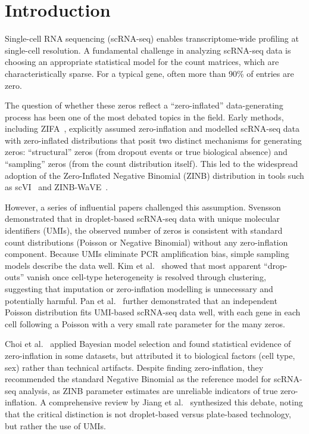 \documentclass{article}
\begin{document}
\section{Introduction}

Single-cell RNA sequencing (scRNA-seq) enables transcriptome-wide profiling at single-cell resolution.
A fundamental challenge in analyzing scRNA-seq data is choosing an appropriate statistical model for the count matrices, which are characteristically sparse.
For a typical gene, often more than 90\% of entries are zero.

The question of whether these zeros reflect a ``zero-inflated'' data-generating process has been one of the most debated topics in the field.
Early methods, including ZIFA~\cite{pierson2015zifa}, explicitly assumed zero-inflation and modelled scRNA-seq data with zero-inflated distributions that posit two distinct mechanisms for generating zeros: ``structural'' zeros (from dropout events or true biological absence) and ``sampling'' zeros (from the count distribution itself).
This led to the widespread adoption of the Zero-Inflated Negative Binomial (ZINB) distribution in tools such as scVI~\cite{lopez2018deep} and ZINB-WaVE~\cite{risso2018general}.

However, a series of influential papers challenged this assumption.
Svensson~\cite{svensson2020droplet} demonstrated that in droplet-based scRNA-seq data with unique molecular identifiers (UMIs), the observed number of zeros is consistent with standard count distributions (Poisson or Negative Binomial) without any zero-inflation component.
Because UMIs eliminate PCR amplification bias, simple sampling models describe the data well.
Kim et al.~\cite{kim2020demystifying} showed that most apparent ``drop-outs'' vanish once cell-type heterogeneity is resolved through clustering, suggesting that imputation or zero-inflation modelling is unnecessary and potentially harmful.
Pan et al.~\cite{pan2023poisson} further demonstrated that an independent Poisson distribution fits UMI-based scRNA-seq data well, with each gene in each cell following a Poisson with a very small rate parameter for the many zeros.

Choi et al.~\cite{choi2020bayesian} applied Bayesian model selection and found statistical evidence of zero-inflation in some datasets, but attributed it to biological factors (cell type, sex) rather than technical artifacts.
Despite finding zero-inflation, they recommended the standard Negative Binomial as the reference model for scRNA-seq analysis, as ZINB parameter estimates are unreliable indicators of true zero-inflation.
A comprehensive review by Jiang et al.~\cite{jiang2022statistics} synthesized this debate, noting that the critical distinction is not droplet-based versus plate-based technology, but rather the use of UMIs.
\end{document}
